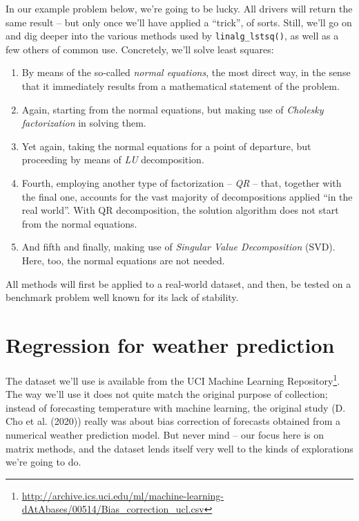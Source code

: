 \documentclass[
  letterpaper,
]{krantz}
\DeclareRobustCommand{\href}[2]{#2\footnote{\url{#1}}}
\begin{document}
In our example problem below, we're going to be lucky. All drivers will
return the same result -- but only once we'll have applied a ``trick'',
of sorts. Still, we'll go on and dig deeper into the various methods
used by \texttt{linalg\_lstsq()}, as well as a few others of common use.
Concretely, we'll solve least squares:

\begin{enumerate}
\def\labelenumi{\arabic{enumi}.}
\item
  By means of the so-called \emph{normal equations}, the most direct
  way, in the sense that it immediately results from a mathematical
  statement of the problem.
\item
  Again, starting from the normal equations, but making use of
  \emph{Cholesky factorization} in solving them.
\item
  Yet again, taking the normal equations for a point of departure, but
  proceeding by means of \emph{LU} decomposition.
\item
  Fourth, employing another type of factorization -- \emph{QR} -- that,
  together with the final one, accounts for the vast majority of
  decompositions applied ``in the real world''. With QR decomposition,
  the solution algorithm does not start from the normal equations.
\item
  And fifth and finally, making use of \emph{Singular Value
  Decomposition} (SVD). Here, too, the normal equations are not needed.
\end{enumerate}

All methods will first be applied to a real-world dataset, and then, be
tested on a benchmark problem well known for its lack of stability.

\hypertarget{regression-for-weather-prediction}{%
\section{Regression for weather
prediction}\label{regression-for-weather-prediction}}

The dataset we'll use is available from the
\href{http://archive.ics.uci.edu/ml/machine-learning-dAtAbases/00514/Bias_correction_ucl.csv}{UCI
Machine Learning Repository}. The way we'll use it does not quite match
the original purpose of collection; instead of forecasting temperature
with machine learning, the original study (D. Cho et al. (2020)) really
was about bias correction of forecasts obtained from a numerical weather
prediction model. But never mind -- our focus here is on matrix methods,
and the dataset lends itself very well to the kinds of explorations
we're going to do.
\end{document}
